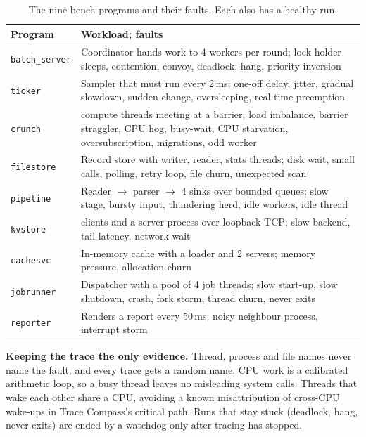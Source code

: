 \begin{table}[t]
\centering
\caption{The nine bench programs and their faults. Each also has a healthy run.}
\label{tab:programs}
\footnotesize
\setlength{\tabcolsep}{3pt}
\begin{tabularx}{\columnwidth}{@{}>{\raggedright\arraybackslash}p{1.45cm}>{\raggedright\arraybackslash}X@{}}
\toprule
Program & Workload; faults \\
\midrule
\texttt{batch\_server} & Coordinator hands work to 4 workers per round; lock holder sleeps, contention, convoy, deadlock, hang, priority inversion \\
\texttt{ticker} & Sampler that must run every 2\,ms; one-off delay, jitter, gradual slowdown, sudden change, oversleeping, real-time preemption \\
\texttt{crunch} & 8 compute threads meeting at a barrier; load imbalance, barrier straggler, CPU hog, busy-wait, CPU starvation, oversubscription, migrations, odd worker \\
\texttt{filestore} & Record store with writer, reader, stats threads; disk wait, small calls, polling, retry loop, file churn, unexpected scan \\
\texttt{pipeline} & Reader $\rightarrow$ parser $\rightarrow$ 4 sinks over bounded queues; slow stage, bursty input, thundering herd, idle workers, idle thread \\
\texttt{kvstore} & 4 clients and a server process over loopback TCP; slow backend, tail latency, network wait \\
\texttt{cachesvc} & In-memory cache with a loader and 2 servers; memory pressure, allocation churn \\
\texttt{jobrunner} & Dispatcher with a pool of 4 job threads; slow start-up, slow shutdown, crash, fork storm, thread churn, never exits \\
\texttt{reporter} & Renders a report every 50\,ms; noisy neighbour process, interrupt storm \\
\bottomrule
\end{tabularx}
\end{table}

\textbf{Keeping the trace the only evidence.} Thread, process and file names never name the fault, and every trace gets a random name. CPU work is a calibrated arithmetic loop, so a busy thread leaves no misleading system calls. Threads that wake each other share a CPU, avoiding a known misattribution of cross-CPU wake-ups in Trace Compass's critical path. Runs that stay stuck (deadlock, hang, never exits) are ended by a watchdog only after tracing has stopped.

